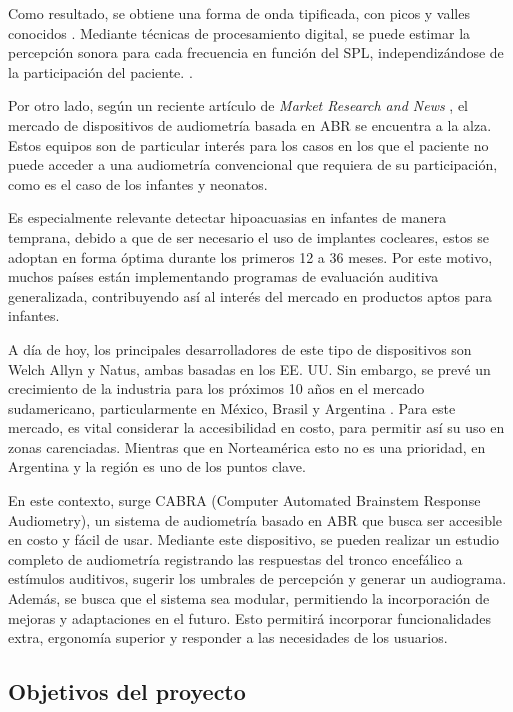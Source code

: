 Como resultado, se obtiene una forma de onda tipificada, con picos y valles conocidos \cite{shojaeemend_automated_2018}. Mediante técnicas de procesamiento digital, se puede estimar la percepción sonora para cada frecuencia en función del SPL, independizándose de la participación del paciente. \cite{silva_objective_2009}.

Por otro lado, según un reciente artículo de \textit{Market Research and News} \cite{news_abr_nodate}, el mercado de dispositivos de audiometría basada en ABR se encuentra a la alza. Estos equipos son de particular interés para los casos en los que el paciente no puede acceder a una audiometría convencional que requiera de su participación, como es el caso de los infantes y neonatos.

Es especialmente relevante detectar hipoacuasias en infantes de manera temprana, debido a que de ser necesario el uso de implantes cocleares, estos se adoptan en forma óptima durante los primeros 12 a 36 meses.
Por este motivo, muchos países están implementando programas de evaluación auditiva generalizada, contribuyendo así al interés del mercado en productos aptos para infantes.

A día de hoy, los principales desarrolladores de este tipo de dispositivos son Welch Allyn y Natus, ambas basadas en los EE. UU. Sin embargo, se prevé un crecimiento de la industria para los próximos 10 años en el mercado sudamericano, particularmente en México, Brasil y Argentina \cite{news_abr_nodate}. Para este mercado, es vital considerar la accesibilidad en costo, para permitir así su uso en zonas carenciadas.
Mientras que en Norteamérica esto no es una prioridad, en Argentina y la región es uno de los puntos clave.

En este contexto, surge CABRA (Computer Automated Brainstem Response Audiometry), un sistema de audiometría basado en ABR que busca ser accesible en costo y fácil de usar. Mediante este dispositivo, se pueden realizar un estudio completo de audiometría registrando las respuestas del tronco encefálico a estímulos auditivos, sugerir los umbrales de percepción y generar un audiograma. Además, se busca que el sistema sea modular, permitiendo la incorporación de mejoras y adaptaciones en el futuro. Esto permitirá incorporar funcionalidades extra, ergonomía superior y responder a las necesidades de los usuarios.

\subsection{Objetivos del proyecto} \label{objetivos}

